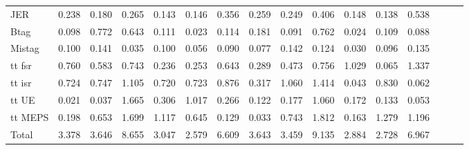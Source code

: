\begin{table}[]
{\begin{tabular}{|l|ccc|ccc|ccc|ccc|ccc|}
      JER                                        & 0.238 & 0.180 & 0.265 & 0.143 & 0.146 & 0.356 & 0.259 & 0.249 & 0.406 & 0.148 & 0.138 & 0.538 \\ 
      Btag                                       & 0.098 & 0.772 & 0.643 & 0.111 & 0.023 & 0.114 & 0.181 & 0.091 & 0.762 & 0.024 & 0.109 & 0.088 \\ 
      Mistag                                     & 0.100 & 0.141 & 0.035 & 0.100 & 0.056 & 0.090 & 0.077 & 0.142 & 0.124 & 0.030 & 0.096 & 0.135 \\ 
      tt fsr                                     & 0.760 & 0.583 & 0.743 & 0.236 & 0.253 & 0.643 & 0.289 & 0.473 & 0.756 & 1.029 & 0.065 & 1.337 \\ 
      tt isr                                     & 0.724 & 0.747 & 1.105 & 0.720 & 0.723 & 0.876 & 0.317 & 1.060 & 1.414 & 0.043 & 0.830 & 0.062 \\ 
      tt UE                                      & 0.021 & 0.037 & 1.665 & 0.306 & 1.017 & 0.266 & 0.122 & 0.177 & 1.060 & 0.172 & 0.133 & 0.053 \\ 
      tt MEPS                                    & 0.198 & 0.653 & 1.699 & 1.117 & 0.645 & 0.129 & 0.033 & 0.743 & 1.812 & 0.163 & 1.279 & 1.196 \\ 
      \hline
      Total                                      & 3.378 & 3.646 & 8.655 & 3.047 & 2.579 & 6.609 & 3.643 & 3.459 & 9.135 & 2.884 & 2.728 & 6.967 \\ 
      \hline
      \end{tabular}
  }
 
  \label{tab:syst_alt}
\end{table}

